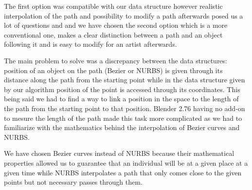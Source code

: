 The first option was compatible with our data structure however realistic interpolation of the path and possibility to modify a path afterwards posed us a lot of questions and and we have chosen the second option which is a more conventional one, makes a clear distinction between a path and an object following it and is easy to modify for an artist afterwards. 

The main problem to solve was a discrepancy between the data structures: position of an object on the path (Bezier or NURBS) is given through its distance along the path from the starting point while in the data structure given by our algorithm position of the point is accessed through its coordinates. This being said we had to find a way to link a position in the space to the length of the path from the starting point to that position. Blender 2.76 having no add-on to mesure the length of the path made this task more complicated as we had to familiarize with the mathematics behind the interpolation of Bezier curves and NURBS.   

We have chosen Bezier curves instead of NURBS because their mathematical properties allowed us to guarantee that an individual will be at a given place at a given time while NURBS interpolates a path that only comes close to the given points but not necessary passes through them.

